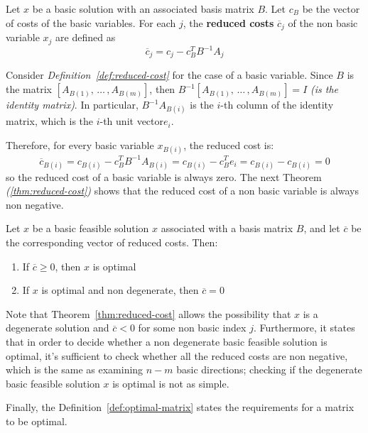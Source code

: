 \documentclass[english]{article}
\begin{document}
\begin{definition}
  Let \(x\) be a basic solution with an associated basis matrix \(B\).
  Let \(c_B\) be the vector of costs of the basic variables.
  For each \(j\), the \textbf{reduced costs} \(\overline{c}_j\) of the non basic variable \(x_j\) are defined as
  \[ \overline{c}_j = c_j - c^T_B B^{-1} A_j \]
  \label{def:reduced-cost}
\end{definition}

\bigskip
Consider \textit{Definition~\ref{def:reduced-cost}} for the case of a basic variable.
Since \(B\) is the matrix \(\left[ A_{B(1)}, \, \ldots \,, A_{B(m)} \right]\), then \(B^{-1}[A_{B(1)}, \, \ldots \,, A_{B(m)}] = I\) \textit{(is the identity matrix)}.
In particular, \(B^{-1} A_{B(i)}\) is the \(i\)-th column of the identity matrix, which is the \(i\)-th unit vector\(e_i\).

Therefore, for every basic variable \(x_{B(i)}\), the reduced cost is:
\[ \overline{c}_{B(i)} = c_{B(i)} - c^T_B B^{-1} A_{B(i)} = c_{B(i)} - c^T_B e_i = c_{B(i)} -  c_{B(i)} = 0 \]
so the reduced cost of a basic variable is always zero.
The next Theorem \textit{(\ref{thm:reduced-cost})} shows that the reduced cost of a non basic variable is always non negative.

\begin{theorem}
  Let \(x\) be a basic feasible solution \(x\) associated with a basis matrix \(B\), and let \(\overline{c}\) be the corresponding vector of reduced costs.
  Then:

  \begin{enumerate}
    \item If \(\overline{c} \geq 0\), then \(x\) is optimal
    \item If \(x\) is optimal and non degenerate, then \(\overline{c} = 0\)
  \end{enumerate}
  \label{thm:reduced-cost}
\end{theorem}

\bigskip
Note that Theorem~\ref{thm:reduced-cost} allows the possibility that \(x\) is a degenerate solution and \(\overline{c} < 0\) for some non basic index \(j\).
Furthermore, it states that in order to decide whether a non degenerate basic feasible solution is optimal, it's sufficient to check whether all the reduced costs are non negative, which is the same as examining \(n-m\) basic directions;
checking if the degenerate basic feasible solution \(x\) is optimal is not as simple.

Finally, the Definition~\ref{def:optimal-matrix} states the requirements for a matrix to be optimal.
\end{document}
